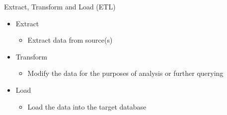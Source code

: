 \documentclass[10pt, xcolor=table]{beamer}
\begin{document}


\begin{frame}{Extract, Transform and Load (ETL)}
	\begin{itemize}
		\item Extract
		\begin{itemize}
			\item Extract data from source(s)
		\end{itemize}
		\item Transform
		\begin{itemize}
			\item Modify the data for the purposes of analysis or further querying
		\end{itemize}
		\item Load
		\begin{itemize}
			\item Load the data into the target database
		\end{itemize}
	\end{itemize}
\end{frame}


\note{
\scriptsize

}
\end{document}
